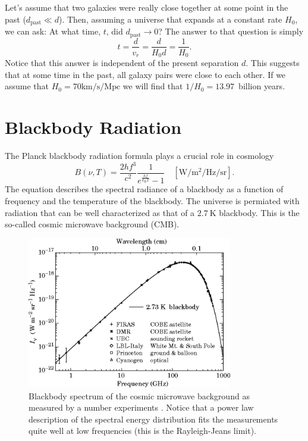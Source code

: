 \documentclass[a4paper,12pt]{article}
\theoremstyle{remark}
\newcommand{\mrm}[1]{\mathrm{#1}}
\renewcommand{\=}[1]{\stackrel{#1}{=}} %
\theoremstyle{plain}
\theoremstyle{definition}
\begin{document}
Let's assume that two galaxies were really close together at some point in the past ($d_\mrm{past} \ll d$). Then, assuming a universe that expands at a constant rate $H_0$, we can ask: At what time, $t$, did $d_\mrm{past} \to 0$? The answer to that question is simply 
\begin{equation}
t = \frac{d}{v_r} = \frac{d}{H_0 d} = \frac{1}{H_0}.
\end{equation}
Notice that this answer is independent of the present separation $d$. This suggests that at some time in the past, all galaxy pairs were close to each other. If we assume that $H_0 = 70 \mrm{km/s/Mpc}$ we will find that $1/H_0 = 13.97$~billion years. 



\section{Blackbody Radiation}
The Planck blackbody radiation formula plays a crucial role in cosmology
\begin{equation}
B(\nu, T) = \frac{2hf^3}{c^2} \frac{1}{e^\frac{hf}{k_\mrm{B}T} - 1} \quad [\mrm{W/m^2/Hz/sr}].
\label{eq:bb}
\end{equation}
The equation describes the spectral radiance of a blackbody as a function of frequency and the temperature of the blackbody. The universe is permiated with radiation that can be well characterized as that of a $2.7\:\mrm{K}$ blackbody. This is the so-called cosmic microwave background (CMB).

\begin{figure}[t]
\begin{center}
    \includegraphics*[angle=0,width=0.8\textwidth]{img/cmb_spectrum.png}
    \caption[Insert text]{Blackbody spectrum of the cosmic microwave background as measured by a number experiments \cite{Smoot1998}. Notice that a power law description of the spectral energy distribution fits the measurements quite well at low frequencies (this is the Rayleigh-Jeans limit).}
\label{fig:cmb_spectrum}
\end{center}
\end{figure}
 
\end{document}
